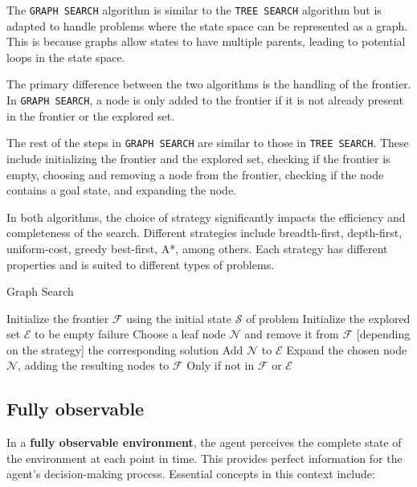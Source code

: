 \documentclass[a4paper,UKenglish,cleveref, autoref, thm-restate]{qlinhta}
\begin{document}
The \texttt{GRAPH SEARCH} algorithm is similar to the \texttt{TREE SEARCH} algorithm but is adapted to handle problems where the state space can be represented as a graph. This is because graphs allow states to have multiple parents, leading to potential loops in the state space.

The primary difference between the two algorithms is the handling of the frontier. In \texttt{GRAPH SEARCH}, a node is only added to the frontier if it is not already present in the frontier or the explored set.

The rest of the steps in \texttt{GRAPH SEARCH} are similar to those in \texttt{TREE SEARCH}. These include initializing the frontier and the explored set, checking if the frontier is empty, choosing and removing a node from the frontier, checking if the node contains a goal state, and expanding the node.

In both algorithms, the choice of strategy significantly impacts the efficiency and completeness of the search. Different strategies include breadth-first, depth-first, uniform-cost, greedy best-first, A*, among others. Each strategy has different properties and is suited to different types of problems.
\begin{algorithm}[H]
\caption{Graph Search}\label{alg:graph_search}
\begin{algorithmic}[1]
\State Initialize the frontier $\mathcal{F}$ using the initial state $\mathcal{S}$ of problem
\State Initialize the explored set $\mathcal{E}$ to be empty
        \State \Return failure
    \EndIf
    \State Choose a leaf node $\mathcal{N}$ and remove it from $\mathcal{F}$ [depending on the strategy]
        \State \Return the corresponding solution
    \EndIf
    \State Add $\mathcal{N}$ to $\mathcal{E}$
    \State Expand the chosen node $\mathcal{N}$, adding the resulting nodes to $\mathcal{F}$
    \State Only if not in $\mathcal{F}$ or $\mathcal{E}$
\EndWhile
\EndProcedure
\end{algorithmic}
\end{algorithm}

\subsection{Fully observable}
In a \textbf{fully observable environment}, the agent perceives the complete state of the environment at each point in time. This provides perfect information for the agent's decision-making process. Essential concepts in this context include:
\end{document}
